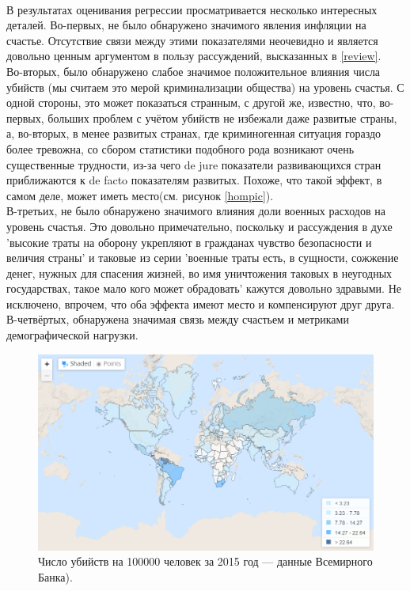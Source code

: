 \documentclass[russian]{vegareport}
\begin{document}
        \\
        В результатах оценивания регрессии просматривается несколько интересных деталей. 
        Во-первых, не было обнаружено значимого явления инфляции на счастье. 
        Отсутствие связи между этими показателями неочевидно и является 
        довольно ценным аргументом в пользу рассуждений, высказанных в \ref{review}.
        \\
        Во-вторых, было обнаружено слабое значимое положительное влияния числа 
        убийств (мы считаем это мерой криминализации общества) на уровень счастья. 
        С одной стороны, это может показаться странным, с другой же, известно, что, 
        во-первых, больших проблем с учётом убийств не избежали даже развитые страны, а, 
        во-вторых, в менее развитых странах, где криминогенная ситуация гораздо более тревожна, 
        со сбором статистики подобного рода возникают очень существенные трудности, 
        из-за чего de jure показатели развивающихся стран приближаются к de facto показателям развитых. 
        Похоже, что такой эффект, в самом деле, может иметь место(см. рисунок \ref{hompic}).
        \\
        В-третьих, не было обнаружено значимого влияния доли военных расходов на уровень счастья. 
        Это довольно примечательно, поскольку и рассуждения в духе 'высокие траты на оборону 
        укрепляют в гражданах чувство безопасности и величия страны' и таковые из серии 
        'военные траты есть, в сущности, сожжение денег, нужных для спасения жизней, 
        во имя уничтожения таковых в неугодных государствах, такое мало кого может обрадовать' 
        кажутся довольно здравыми. Не исключено, впрочем, что оба эффекта имеют место и компенсируют друг друга.
        \\
        В-четвёртых, обнаружена значимая связь между счастьем и метриками демографической нагрузки. 
        \begin{figure} \label{hompic}
            \centering
            \includegraphics[scale=0.45]{homicides.png}
            \caption{Число убийств на 100000 человек за 2015 год --- данные Всемирного Банка).}
            \label{lect02:pic1}
        \end{figure}
\end{document}
